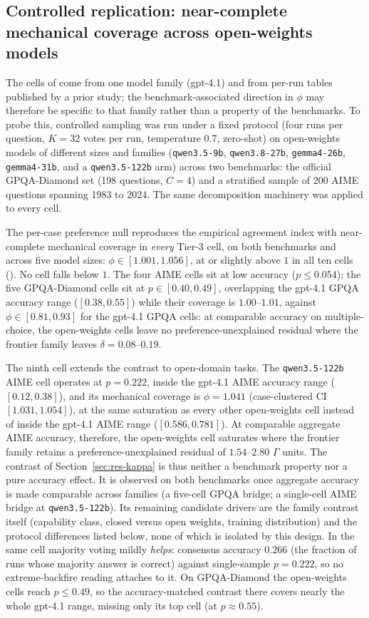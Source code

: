 \documentclass{article}
\newcommand{\agreementIndex}{\Gamma}
\begin{document}
\subsection{Controlled replication: near-complete mechanical coverage across open-weights models}
\label{sec:res-tier3}

The cells of  come from one model family (gpt-4.1) and
from per-run tables published by a prior study; the benchmark-associated
direction in $\phi$ may therefore be specific to that family rather than
a property of the benchmarks. To probe this, controlled sampling was run
under a fixed protocol (four runs per question, $K=32$ votes per run,
temperature $0.7$, zero-shot) on open-weights models of different
sizes and families (\texttt{qwen3.5-9b}, \texttt{qwen3.8-27b},
\texttt{gemma4-26b}, \texttt{gemma4-31b}, and a \texttt{qwen3.5-122b}
arm) across two benchmarks: the official
GPQA-Diamond set (198 questions, $C=4$) and a stratified sample of 200
AIME questions spanning 1983 to 2024. The same decomposition machinery
was applied to every cell.

The per-case preference null reproduces the empirical agreement index
with near-complete mechanical coverage in \emph{every} Tier-3 cell, on
both benchmarks and across five model sizes:
$\phi\in[1.001,1.056]$, at or slightly above $1$ in all ten cells
(). No cell falls below $1$. The four AIME cells sit at low accuracy
($p\le0.054$); the five GPQA-Diamond cells sit at
$p\in[0.40,0.49]$, overlapping the gpt-4.1 GPQA accuracy range
($[0.38,0.55]$) while their coverage is $1.00$--$1.01$, against
$\phi\in[0.81,0.93]$ for the gpt-4.1 GPQA cells: at comparable accuracy
on multiple-choice, the open-weights cells leave no
preference-unexplained residual where the frontier family leaves
$\delta=0.08$--$0.19$.

The ninth cell extends the contrast to open-domain tasks. The
\texttt{qwen3.5-122b} AIME cell operates at $p=0.222$, inside the
gpt-4.1 AIME accuracy range ($[0.12,0.38]$), and its mechanical coverage
is $\phi=1.041$ (case-clustered CI $[1.031,1.054]$), at the same
saturation as every other open-weights cell instead of inside the
gpt-4.1 AIME range ($[0.586,0.781]$). At comparable aggregate AIME accuracy,
therefore, the open-weights cell saturates where the frontier family
retains a preference-unexplained residual of $1.54$--$2.80$ $\agreementIndex$
units. The contrast of Section~\ref{sec:res-kappa} is thus neither a
benchmark property nor a pure accuracy effect. It is observed on both
benchmarks once aggregate accuracy is made comparable across families
(a five-cell GPQA bridge; a single-cell AIME bridge at \texttt{qwen3.5-122b}). Its remaining
candidate drivers are the family contrast itself (capability class,
closed versus open weights, training distribution) and the protocol
differences listed below, none of which is isolated by this design. In
the same cell majority voting mildly \emph{helps}: consensus accuracy
$0.266$ (the fraction of runs whose majority answer is correct)
against single-sample $p=0.222$, so no extreme-backfire reading
attaches to it. On
GPQA-Diamond the open-weights cells reach $p\le0.49$, so the
accuracy-matched contrast there covers nearly the whole gpt-4.1 range,
missing only its top cell (at $p\approx0.55$).
\end{document}

